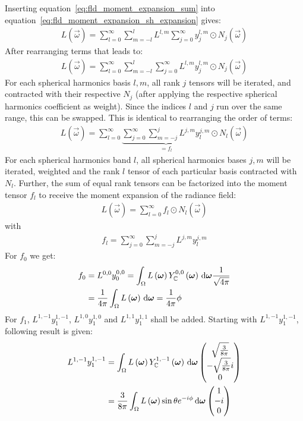 Inserting equation~\ref{eq:fld_moment_expansion_sum} into equation~\ref{eq:fld_moment_expansion_sh_expansion} gives:
\begin{align}
L\left(\vec{\omega}\right) =
\sum_{l=0}^{\infty}\sum_{m=-l}^{l}L^{l,m}\sum_{j=0}^\infty{y^{l,m}_j\odot N_j(\vec{\omega})}
\end{align}
After rearranging terms that leads to:
\begin{align}
L\left(\vec{\omega}\right) =
\sum_{l=0}^{\infty}\sum_{m=-l}^{l}\sum_{j=0}^\infty{L^{l,m}y^{l,m}_j\odot N_j(\vec{\omega})}
\end{align}
For each spherical harmonics basis $l,m$, all rank $j$ tensors will be iterated, and contracted with their respective $N_j$ (after applying the respective spherical harmonics coefficient as weight). Since the indices $l$ and $j$ run over the same range, this can be swapped. This is identical to rearranging the order of terms:
\begin{align}
L\left(\vec{\omega}\right) =
\sum_{l=0}^{\infty}\underbrace{\sum_{j=0}^\infty\sum_{m=-j}^{j}{L^{j,m}y^{j,m}_l}}_{=f_l}
\odot N_l(\vec{\omega})
\end{align}
For each spherical harmonics band $l$, all spherical harmonics bases $j,m$ will be iterated, weighted and the rank $l$ tensor of each particular basis contracted with $N_l$. Further, the sum of equal rank tensors can be factorized into the moment tensor $f_l$ to receive the moment expansion of the radiance field:
\begin{align}
L\left(\vec{\omega}\right) =
\sum_{l=0}^{\infty}f_l\odot N_l(\vec{\omega})
\end{align}
with
\begin{align}
f_l = \sum_{j=0}^\infty\sum_{m=-j}^{j}{L^{j,m}y^{j,m}_l}
\end{align}
For $f_0$ we get:
\begin{align}
f_0 &= L^{0,0}y^{0,0}_0 = \int_\Omega{L\left(\boldsymbol{\mathbf{\omega}}\right)Y_{\mathbb{C}}^{0,0}\left(\boldsymbol{\mathbf{\omega}}\right)\,\mathrm{d}\boldsymbol{\mathbf{\omega}}}\frac{1}{\sqrt{4\pi}}\\
&=
\frac{1}{4\pi}\int_\Omega{L\left(\boldsymbol{\mathbf{\omega}}\right)\,\mathrm{d}\boldsymbol{\mathbf{\omega}}} =
\frac{1}{4\pi}\phi
\end{align}
For $f_1$, $L^{1,-1}y^{1,-1}_1$, $L^{1,0}y^{1,0}_1$ and $L^{1,1}y^{1,1}_1$ shall be added. Starting with $L^{1,-1}y^{1,-1}_1$, following result is given:
\begin{align}
L^{1,-1}y^{1,-1}_1 &= 
\int_\Omega{L\left(\boldsymbol{\mathbf{\omega}}\right)Y_{\mathbb{C}}^{1,-1}\left(\boldsymbol{\mathbf{\omega}}\right)\,\mathrm{d}\boldsymbol{\mathbf{\omega}}}
\begin{pmatrix}\sqrt{\frac{3}{8\pi}}  \\ -\sqrt{\frac{3}{8\pi}}i \\ 0 \end{pmatrix}
\\
&= 
\frac{3}{8\pi}\int_\Omega{L\left(\boldsymbol{\mathbf{\omega}}\right)\operatorname{sin}\theta e^{-i\phi}\,\mathrm{d}\boldsymbol{\mathbf{\omega}}}
\begin{pmatrix}1  \\ -i \\ 0 \end{pmatrix}
\end{align}
